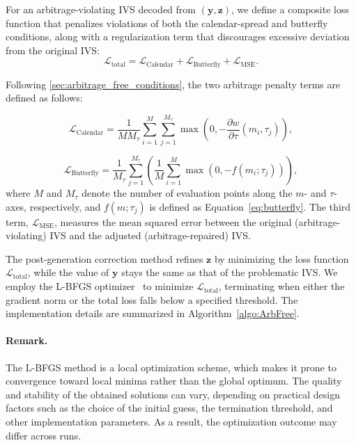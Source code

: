 \documentclass{article}
\begin{document}
For an arbitrage-violating IVS decoded from $(\mathbf{y}, \mathbf{z})$,  we define a composite loss function that penalizes violations of both the calendar-spread and butterfly conditions, along with a regularization term that discourages excessive deviation from the original IVS:
\begin{equation}
    \mathcal{L}_{\text{total}} = \mathcal{L}_{\text{Calendar}} + \mathcal{L}_{\text{Butterfly}} + \mathcal{L}_{\text{MSE}}.
\end{equation}


Following \autoref{sec:arbitrage_free_conditions},  the two arbitrage penalty terms are defined as follows:

\begin{equation}
    \mathcal{L}_{\text{Calendar}} = \frac{1}{MM_{\tau}} \sum_{i=1}^{M} \sum_{j=1}^{M_\tau} \max\left(0, -\frac{\partial w}{\partial \tau}(m_i, \tau_j)\right),
\end{equation}

\begin{equation}
    \mathcal{L}_{\text{Butterfly}} = \frac{1}{M_\tau} \sum_{j=1}^{M_\tau} \left( \frac{1}{M} \sum_{i=1}^{M} \max\left(0, -f(m_i; \tau_j)\right) \right),
\end{equation}
where \( M \) and \( M_\tau \) denote the number of evaluation points along the \( m \)- and \( \tau \)-axes, respectively, and $f(m; \tau_j)$ is defined as Equation~\eqref{eq:butterfly}. The third term, \( \mathcal{L}_{\text{MSE}} \), measures the mean squared error between the original (arbitrage-violating) IVS and the adjusted (arbitrage-repaired) IVS.


The post-generation correction method 
refines $\mathbf{z}$ by minimizing the loss function $\mathcal{L}_{\text{total}}$, while the value of  $\mathbf{y}$ stays the same as that of the problematic IVS. We employ the L-BFGS optimizer~\cite{liu1989limited} to minimize 
$\mathcal{L}_{\text{total}}$, terminating when either the gradient norm or the total loss 
 falls below a specified threshold. The implementation details are 
summarized in Algorithm~\ref{algo:ArbFree}.

\paragraph{Remark.}
The L-BFGS method is a local optimization scheme, which makes it prone to convergence toward local minima rather than the global optimum. The quality and stability of the obtained solutions can vary, depending on practical design factors such as the choice of the initial guess, the termination threshold, and other implementation parameters. As a result, the optimization outcome may differ across runs.
\end{document}
